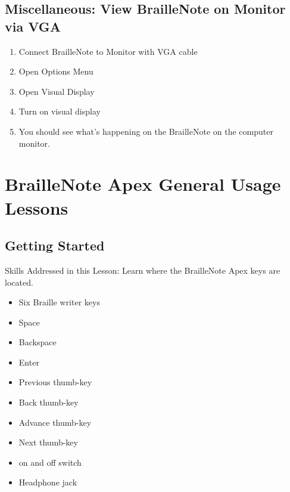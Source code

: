 \documentclass[10pt,letterpaper,twoside]{report}
\begin{document}
{{{\section{Miscellaneous: View BrailleNote on Monitor via VGA}
\begin{enumerate}
	\item Connect BrailleNote to Monitor with VGA cable
	\item Open Options Menu 
	\item Open Visual Display 
	\item Turn on visual display 
	\item You should see what's happening on the BrailleNote on the computer monitor.
\end{enumerate}
\setcounter{section}{0}
\clearpage
\chapter{BrailleNote Apex General Usage Lessons}
\section{ Getting Started}
Skills Addressed in this Lesson:
Learn where the BrailleNote Apex keys are located.
\begin{itemize}
	\item Six Braille writer keys
	\item Space
	\item Backspace
	\item Enter
	\item Previous thumb-key
	\item Back thumb-key
	\item Advance thumb-key
	\item Next thumb-key
	\item on and off switch
	\item Headphone jack
\end{itemize}
}}}
\end{document}
